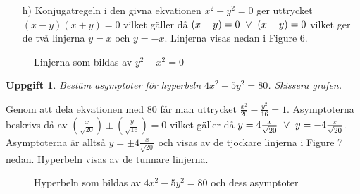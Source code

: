 \documentclass{article}
\newtheorem{thr}{Uppgift}
\begin{document}
\newpage

\begin{enumerate}
    \item[h)] Konjugatregeln i den givna ekvationen $x^2-y^2=0$ ger uttrycket $(x-y)(x+y)=0$ vilket gäller då $(x-y)=0 \ \vee \  (x+y)=0$ vilket ger de två linjerna $y=x$ och $y=-x$. Linjerna visas nedan i Figure 6.
\end{enumerate}

\begin{figure}[h]
    \center
    \caption{\footnotesize Linjerna som bildas av $y^2-x^2=0$}
\end{figure}


\begin{thr}
Bestäm asymptoter för hyperbeln $4x^2-5y^2=80$. Skissera grafen.
\end{thr}

Genom att dela ekvationen med 80 får man uttrycket $\frac{x^2}{20}-\frac{y^2}{16}=1$. Asymptoterna beskrivs då av $(\frac{x}{\sqrt{20}}) \pm (\frac{y}{\sqrt{16}})=0$ vilket gäller då $y=4\frac{x}{\sqrt{20}} \ \vee \  y=-4\frac{x}{\sqrt{20}}$. Asymptoterna är alltså $y=\pm 4\frac{x}{\sqrt{20}}$ och visas av de tjockare linjerna i Figure 7 nedan. Hyperbeln visas av de tunnare linjerna.

\begin{figure}[h]
    \center
    \caption{\footnotesize Hyperbeln som bildas av $4x^2-5y^2=80$ och dess asymptoter}
\end{figure}
\end{document}
